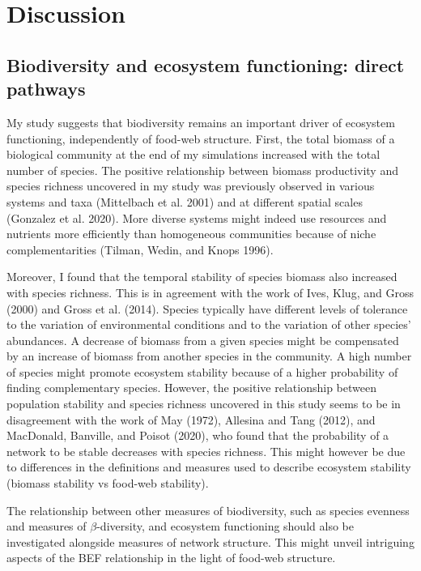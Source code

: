 \documentclass[10pt,oneside]{article}
\begin{document}
\hypertarget{discussion}{%
\section{Discussion}\label{discussion}}

\hypertarget{biodiversity-and-ecosystem-functioning-direct-pathways}{%
\subsection{Biodiversity and ecosystem functioning: direct
pathways}\label{biodiversity-and-ecosystem-functioning-direct-pathways}}

My study suggests that biodiversity remains an important driver of
ecosystem functioning, independently of food-web structure. First, the
total biomass of a biological community at the end of my simulations
increased with the total number of species. The positive relationship
between biomass productivity and species richness uncovered in my study
was previously observed in various systems and taxa (Mittelbach et al.
2001) and at different spatial scales (Gonzalez et al. 2020). More
diverse systems might indeed use resources and nutrients more
efficiently than homogeneous communities because of niche
complementarities (Tilman, Wedin, and Knops 1996).

Moreover, I found that the temporal stability of species biomass also
increased with species richness. This is in agreement with the work of
Ives, Klug, and Gross (2000) and Gross et al. (2014). Species typically
have different levels of tolerance to the variation of environmental
conditions and to the variation of other species' abundances. A decrease
of biomass from a given species might be compensated by an increase of
biomass from another species in the community. A high number of species
might promote ecosystem stability because of a higher probability of
finding complementary species. However, the positive relationship
between population stability and species richness uncovered in this
study seems to be in disagreement with the work of May (1972), Allesina
and Tang (2012), and MacDonald, Banville, and Poisot (2020), who found
that the probability of a network to be stable decreases with species
richness. This might however be due to differences in the definitions
and measures used to describe ecosystem stability (biomass stability vs
food-web stability).

The relationship between other measures of biodiversity, such as species
evenness and measures of \(\beta\)-diversity, and ecosystem functioning
should also be investigated alongside measures of network structure.
This might unveil intriguing aspects of the BEF relationship in the
light of food-web structure.
\end{document}
